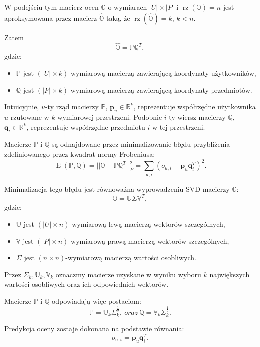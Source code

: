 \documentclass[12pt,a4paper]{report}
\newcommand{\setR}{\mathbb{R}}
\newcommand{\rz}[1]{\operatorname{rz}\left({#1} \right)}
\newcommand{\e}[1]{\operatorname{E}\left({#1} \right)}
\begin{document}
W podejściu tym macierz ocen $\mathbb{O}$ o wymiarach $|\mathit{U}| \times |\mathit{P}|$ i $\rz{\mathbb{O}} = n$ jest aproksymowana przez macierz $\widehat{\mathbb{O}}$ taką, że $\rz{\widehat{\mathbb{O}}} = k$, $k<n$. 

Zatem
$$
\widehat{\mathbb{O}} = \mathbb{P}\mathbb{Q}^T,
$$
gdzie:
\begin{itemize}
\item $\mathbb{P}$ jest $(|\mathit{U}| \times k)$-wymiarową macierzą zawierającą koordynaty użytkowników,
\item $\mathbb{Q}$ jest $(|\mathit{P}| \times k)$-wymiarową macierzą zawierającą koordynaty przedmiotów.
\end{itemize}

Intuicyjnie, $u$-ty rząd macierzy $\mathbb{P}$, $\mathbf{p}_u \in \setR^k$, reprezentuje współrzędne użytkownika $u$ rzutowane w $k$-wymiarowej przestrzeni. Podobnie $i$-ty wiersz macierzy $\mathbb{Q}$, $\mathbf{q}_i \in \setR^k$, reprezentuje współrzędne przedmiotu $i$ w tej przestrzeni.

Macierze $\mathbb{P}$ i $\mathbb{Q}$ są odnajdowane przez minimalizowanie błędu przybliżenia zdefiniowanego przez kwadrat normy Frobeniusa:
$$
\e{\mathbb{P}, \mathbb{Q}} = ||\mathbb{O}-\mathbb{P} \mathbb{Q}^T||_F^2 = \sum_{u,i}(o_{u,i} - \mathbf{p}_u\mathbf{q}_i^T)^2.
$$

Minimalizacja tego błędu jest równoważna wyprowadzeniu SVD macierzy $\mathbb{O}$:
$$
\mathbb{O} = \mathbb{U} \Sigma \mathbb{V}^T,
$$
gdzie:
\begin{itemize}
\item $\mathbb{U}$ jest $(|\mathit{U}| \times n)$-wymiarową lewą macierzą wektorów szczególnych,
\item $\mathbb{V}$ jest $(|\mathit{P}| \times n)$-wymiarową prawą macierzą wektorów szczególnych,
\item $\Sigma$ jest $(n\times n)$-wymiarową macierzą wartości osobliwych.
\end{itemize}

Przez $\Sigma_k, \mathbb{U}_k, \mathbb{V}_k$ oznaczmy macierze uzyskane w wyniku wyboru $k$ największych wartości osobliwych oraz ich odpowiednich wektorów. 

Macierze $\mathbb{P}$ i $\mathbb{Q}$ odpowiadają więc postaciom:
$$
\mathbb{P}=\mathbb{U}_k \Sigma_k^{\frac{1}{2}}, \: oraz \: \mathbb{Q}=\mathbb{V}_k \Sigma_k^{\frac{1}{2}}.
$$

Predykcja oceny zostaje dokonana na podstawie równania:
$$
o_{u,i} = \mathbf{p}_u \mathbf{q}_i^T.
$$
\end{document}
